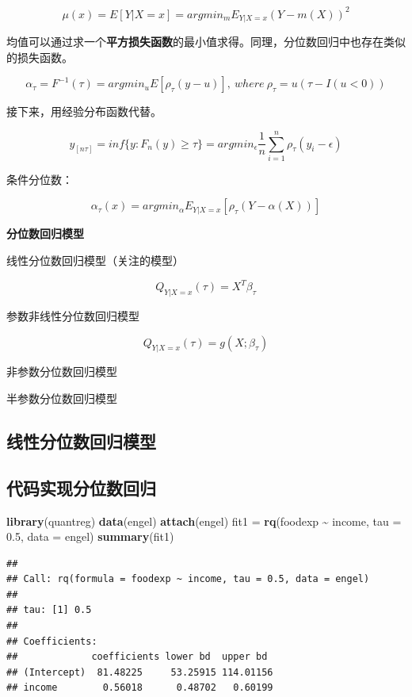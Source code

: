 \documentclass[
]{book}
\newenvironment{Shaded}{\begin{snugshade}}{\end{snugshade}}
\newcommand{\AttributeTok}[1]{\textcolor[rgb]{0.13,0.29,0.53}{#1}}
\newcommand{\FloatTok}[1]{\textcolor[rgb]{0.00,0.00,0.81}{#1}}
\newcommand{\FunctionTok}[1]{\textcolor[rgb]{0.13,0.29,0.53}{\textbf{#1}}}
\newcommand{\NormalTok}[1]{#1}
\newcommand{\OtherTok}[1]{\textcolor[rgb]{0.56,0.35,0.01}{#1}}
\newcommand{\SpecialCharTok}[1]{\textcolor[rgb]{0.81,0.36,0.00}{\textbf{#1}}}
\newcommand{\StringTok}[1]{\textcolor[rgb]{0.31,0.60,0.02}{#1}}
\begin{document}
\[
\mu(x)=E[Y|X=x]=argmin_{m}E_{Y|X=x}(Y-m(X))^2
\]

均值可以通过求一个\textbf{平方损失函数}的最小值求得。同理，分位数回归中也存在类似的损失函数。

\[
\alpha_{\tau}=F^{-1}(\tau)=argmin_{u}E[\rho_{\tau}(y-u)],\ where\ \rho_{\tau}=u(\tau-I(u<0))
\]

接下来，用经验分布函数代替。

\[
y_{[n\tau]}=inf\{y:F_n(y)\geq\tau\}=argmin_{\epsilon}\frac{1}{n}\sum_{i=1}^n\rho_{\tau}(y_i-\epsilon)\]

条件分位数：

\[
\alpha_{\tau}(x)=argmin_{\alpha}E_{Y|X=x}[\rho_{\tau}(Y-\alpha(X))]
\]

\textbf{分位数回归模型}

线性分位数回归模型（关注的模型）

\[
Q_{Y|X=x}(\tau)=X^T\beta_{\tau}
\]

参数非线性分位数回归模型

\[
Q_{Y|X=x}(\tau)=g(X;\beta_{\tau})
\]

非参数分位数回归模型

半参数分位数回归模型

\subsection{线性分位数回归模型}\label{ux7ebfux6027ux5206ux4f4dux6570ux56deux5f52ux6a21ux578b}

\subsection{代码实现分位数回归}\label{ux4ee3ux7801ux5b9eux73b0ux5206ux4f4dux6570ux56deux5f52}

\begin{Shaded}
\begin{Highlighting}[]
\FunctionTok{library}\NormalTok{(quantreg)}
\FunctionTok{data}\NormalTok{(}\StringTok{\textquotesingle{}engel\textquotesingle{}}\NormalTok{)}
\FunctionTok{attach}\NormalTok{(engel)}
\NormalTok{fit1 }\OtherTok{=} \FunctionTok{rq}\NormalTok{(foodexp }\SpecialCharTok{\textasciitilde{}}\NormalTok{ income, }\AttributeTok{tau =} \FloatTok{0.5}\NormalTok{, }\AttributeTok{data =}\NormalTok{ engel) }
\FunctionTok{summary}\NormalTok{(fit1) }
\end{Highlighting}
\end{Shaded}

\begin{verbatim}
## 
## Call: rq(formula = foodexp ~ income, tau = 0.5, data = engel)
## 
## tau: [1] 0.5
## 
## Coefficients:
##             coefficients lower bd  upper bd 
## (Intercept)  81.48225     53.25915 114.01156
## income        0.56018      0.48702   0.60199
\end{verbatim}
\end{document}

